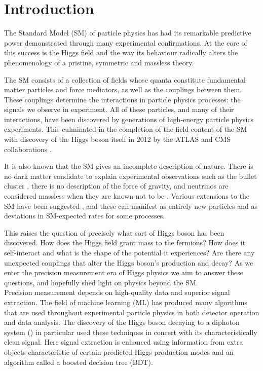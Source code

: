 \chapter{Introduction}
\label{chap:intro}

The Standard Model (SM) of particle physics has had its remarkable predictive power demonstrated through many experimental confirmations. 
At the core of this success is the Higgs field and the way its behaviour radically alters the phenomenology of a pristine, symmetric and massless theory.

The SM consists of a collection of fields whose quanta constitute fundamental matter particles and force mediators, as well as the couplings between them. 
These couplings determine the interactions in particle physics processes: the signals we observe in experiment. 
All of these particles, and many of their interactions, have been discovered by generations of high-energy particle physics experiments. 
This culminated in the completion of the field content of the SM with discovery of the Higgs boson itself in 2012 by the ATLAS and CMS collaborations \cite{ATLAS_Higgs_disc,CMS_Higgs_disc}. 

It is also known that the SM gives an incomplete description of nature. 
There is no dark matter candidate to explain experimental observations such as the bullet cluster \cite{BulletCluster}, there is no description of the force of gravity, 
and neutrinos are considered massless when they are known not to be \cite{NeutrinoOscillation}. 
Various extensions to the SM have been suggested \cite{BSM}, and these can manifest as entirely new particles and as deviations in SM-expected rates for some processes. 

This raises the question of precisely what sort of Higgs boson has been discovered. How does the Higgs field grant mass to the fermions? 
How does it self-interact and what is the shape of the potential it experiences? Are there any unexpected couplings that alter the Higgs boson's production and decay?
As we enter the precision measurement era of Higgs physics we aim to answer these questions, and hopefully shed light on physics beyond the SM.
\\

Precision measurement depends on high-quality data and superior signal extraction.
The field of machine learning (ML) has produced many algorithms that are used throughout experimental particle physics in both detector operation and data analysis. 
The discovery of the Higgs boson decaying to a diphoton system (\Hgg) in particular used these techniques in concert with its characteristically clean signal. 
Here signal extraction is enhanced using information from extra objects characteristic of certain predicted Higgs production modes and an algorithm called a boosted decision tree (BDT). 

